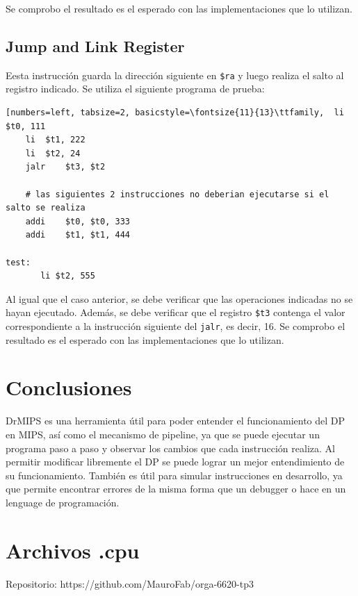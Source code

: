 \documentclass[11pt,a4paper, spanish]{article}
\begin{document}
Se comprobo el resultado es el esperado con las implementaciones que lo utilizan.

\subsection{Jump and Link Register}

Eesta instrucción guarda la dirección siguiente en \texttt{\$ra} y luego realiza el salto al registro
indicado. Se utiliza el siguiente programa de prueba:

\begin{lstlisting}[numbers=left, tabsize=2, basicstyle=\fontsize{11}{13}\ttfamily, 	li	$t0, 111
	li	$t1, 222
	li	$t2, 24
	jalr	$t3, $t2

	# las siguientes 2 instrucciones no deberian ejecutarse si el salto se realiza
	addi	$t0, $t0, 333
	addi	$t1, $t1, 444

test:
       li $t2, 555
\end{lstlisting}

Al igual que el caso anterior, se debe verificar que las operaciones indicadas no se hayan ejecutado.
Además, se debe verificar que el registro \texttt{\$t3} contenga el valor correspondiente a la instrucción siguiente del \texttt{jalr}, es decir, 16.
Se comprobo el resultado es el esperado con las implementaciones que lo utilizan.

\section{Conclusiones}

DrMIPS es una herramienta útil para poder entender el funcionamiento del DP en MIPS, así
como el mecanismo de pipeline, ya que se puede ejecutar un programa paso a paso y observar los cambios
que cada instrucción realiza. Al permitir modificar libremente el DP se puede lograr un mejor
entendimiento de su funcionamiento. También es útil para simular instrucciones en 
desarrollo, ya que permite encontrar errores de la misma forma que un debugger o hace
en un lenguage de programación.


\newpage

\section{Archivos .cpu}

Repositorio: https://github.com/MauroFab/orga-6620-tp3
\end{document}
